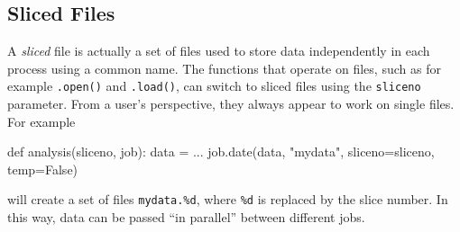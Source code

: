 \subsection{Sliced Files}
\label{sec:slicedfiles}
\begin{leftbar}
A \textsl{sliced} file is actually a set of files used to store data
independently in each \analysis process using a common name.  The
functions that operate on files, such as for example \texttt{.open()}
and \texttt{.load()}, can switch to sliced files using
the \texttt{sliceno} parameter.  From a user's perspective, they
always appear to work on single files.  For example
\begin{python}
def analysis(sliceno, job):
    data = ...
    job.date(data, "mydata", sliceno=sliceno, temp=False)
\end{python}
will create a set of files \texttt{mydata.\%d}, where \texttt{\%d} is
replaced by the slice number.  In this way, data can be passed ``in
parallel'' between different jobs.
\end{leftbar}



